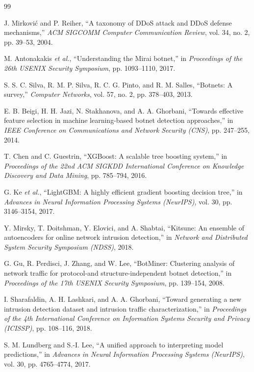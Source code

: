 \begin{thebibliography}{99}

J. Mirkovi\'{c} and P. Reiher, ``A taxonomy of DDoS attack and DDoS defense mechanisms,'' \textit{ACM SIGCOMM Computer Communication Review}, vol. 34, no. 2, pp. 39--53, 2004.

M. Antonakakis \textit{et al.}, ``Understanding the Mirai botnet,'' in \textit{Proceedings of the 26th USENIX Security Symposium}, pp. 1093--1110, 2017.

S. S. C. Silva, R. M. P. Silva, R. C. G. Pinto, and R. M. Salles, ``Botnets: A survey,'' \textit{Computer Networks}, vol. 57, no. 2, pp. 378--403, 2013.

E. B. Beigi, H. H. Jazi, N. Stakhanova, and A. A. Ghorbani, ``Towards effective feature selection in machine learning-based botnet detection approaches,'' in \textit{IEEE Conference on Communications and Network Security (CNS)}, pp. 247--255, 2014.

T. Chen and C. Guestrin, ``XGBoost: A scalable tree boosting system,'' in \textit{Proceedings of the 22nd ACM SIGKDD International Conference on Knowledge Discovery and Data Mining}, pp. 785--794, 2016.

G. Ke \textit{et al.}, ``LightGBM: A highly efficient gradient boosting decision tree,'' in \textit{Advances in Neural Information Processing Systems (NeurIPS)}, vol. 30, pp. 3146--3154, 2017.

Y. Mirsky, T. Doitshman, Y. Elovici, and A. Shabtai, ``Kitsune: An ensemble of autoencoders for online network intrusion detection,'' in \textit{Network and Distributed System Security Symposium (NDSS)}, 2018.

G. Gu, R. Perdisci, J. Zhang, and W. Lee, ``BotMiner: Clustering analysis of network traffic for protocol-and structure-independent botnet detection,'' in \textit{Proceedings of the 17th USENIX Security Symposium}, pp. 139--154, 2008.

I. Sharafaldin, A. H. Lashkari, and A. A. Ghorbani, ``Toward generating a new intrusion detection dataset and intrusion traffic characterization,'' in \textit{Proceedings of the 4th International Conference on Information Systems Security and Privacy (ICISSP)}, pp. 108--116, 2018.

S. M. Lundberg and S.-I. Lee, ``A unified approach to interpreting model predictions,'' in \textit{Advances in Neural Information Processing Systems (NeurIPS)}, vol. 30, pp. 4765--4774, 2017.


\end{thebibliography}

